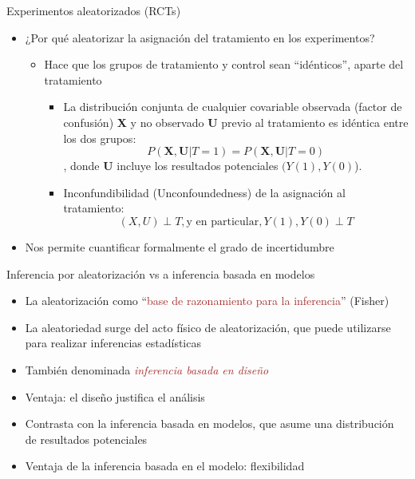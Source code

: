 \documentclass[
  ignorenonframetext,
]{beamer}
\providecommand{\tightlist}{%
  \setlength{\itemsep}{0pt}\setlength{\parskip}{0pt}}
\begin{document}
\begin{frame}{Experimentos aleatorizados (RCTs)}
\protect\hypertarget{experimentos-aleatorizados-rcts}{}
\begin{itemize}
\tightlist
\item
  ¿Por qué aleatorizar la asignación del tratamiento en los
  experimentos? \pause

  \begin{itemize}
  \tightlist
  \item
    Hace que los grupos de tratamiento y control sean ``idénticos'',
    aparte del tratamiento \pause

    \begin{itemize}
    \item
      La distribución conjunta de cualquier covariable observada (factor
      de confusión) \textbf{X} y no observado \textbf{U} previo al
      tratamiento es idéntica entre los dos grupos:
      \[P(\mathbf{X}, \mathbf{U} | T = 1) = P(\mathbf{X}, \mathbf{U} | T = 0)\],
      \pause  donde \textbf{U} incluye los resultados potenciales
      \((Y(1), Y(0)\)). \pause
    \item
      Inconfundibilidad (Unconfoundedness) de la asignación al
      tratamiento:
      \[(X, U) \perp T, \text{y en particular},  {Y(1), Y(0)} \perp T\]
      \pause
    \end{itemize}
  \end{itemize}
\item
  Nos permite cuantificar formalmente el grado de incertidumbre
\end{itemize}
\end{frame}

\begin{frame}{Inferencia por aleatorización vs a inferencia basada en
modelos}
\protect\hypertarget{inferencia-por-aleatorizaciuxf3n-vs-a-inferencia-basada-en-modelos}{}
\begin{itemize}
\tightlist
\item
  La aleatorización como
  ``\textcolor{brown}{base de razonamiento para la inferencia}''
  (Fisher)
\item
  La aleatoriedad surge del acto físico de aleatorización, que puede
  utilizarse para realizar inferencias estadísticas
\item
  También denominada
  \emph{\textcolor{brown}{inferencia basada en diseño}}
\item
  Ventaja: el diseño justifica el análisis \pause
\end{itemize}

\vspace{0.3cm}

\begin{itemize}
\tightlist
\item
  Contrasta con la inferencia basada en modelos, que asume una
  distribución de resultados potenciales
\item
  Ventaja de la inferencia basada en el modelo: flexibilidad
\end{itemize}
\end{frame}
\end{document}
